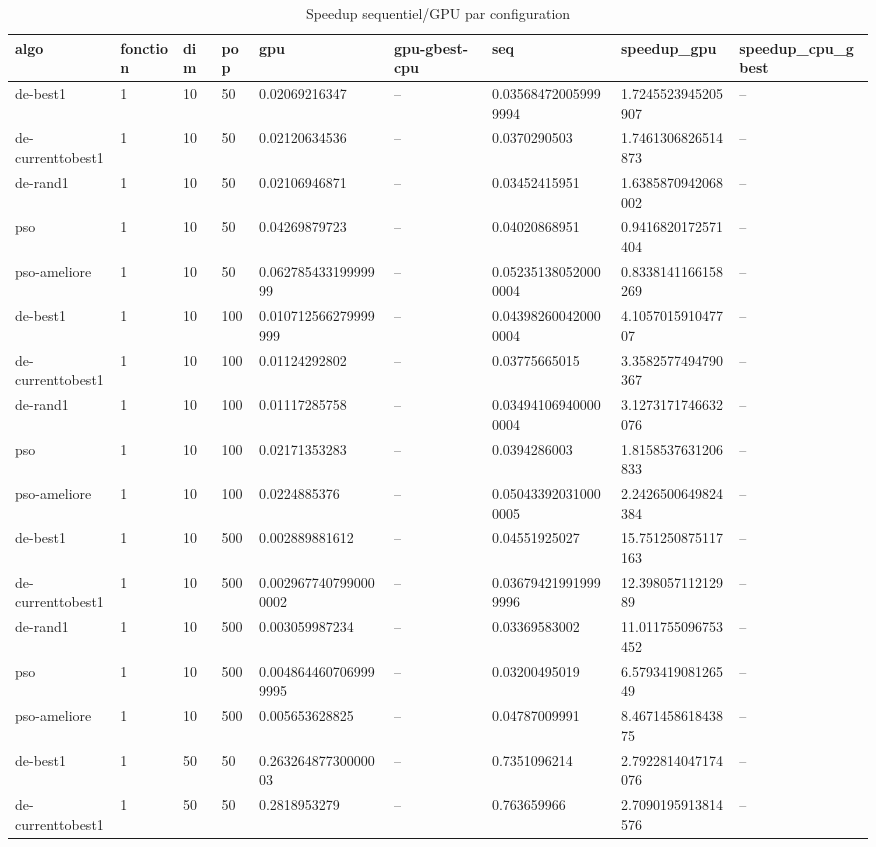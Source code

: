 \begin{table}[t]
\centering
\caption{Speedup sequentiel/GPU par configuration}
\label{tab:generated-speedups}
\scriptsize
\begin{tabular}{lllllllll}
\toprule
algo & fonction & dim & pop & gpu & gpu-gbest-cpu & seq & speedup\_gpu & speedup\_cpu\_gbest \\
\midrule
de-best1 & 1 & 10 & 50 & 0.02069216347 & -- & 0.035684720059999994 & 1.7245523945205907 & -- \\
de-currenttobest1 & 1 & 10 & 50 & 0.02120634536 & -- & 0.0370290503 & 1.7461306826514873 & -- \\
de-rand1 & 1 & 10 & 50 & 0.02106946871 & -- & 0.03452415951 & 1.6385870942068002 & -- \\
pso & 1 & 10 & 50 & 0.04269879723 & -- & 0.04020868951 & 0.9416820172571404 & -- \\
pso-ameliore & 1 & 10 & 50 & 0.06278543319999999 & -- & 0.052351380520000004 & 0.8338141166158269 & -- \\
de-best1 & 1 & 10 & 100 & 0.010712566279999999 & -- & 0.043982600420000004 & 4.105701591047707 & -- \\
de-currenttobest1 & 1 & 10 & 100 & 0.01124292802 & -- & 0.03775665015 & 3.3582577494790367 & -- \\
de-rand1 & 1 & 10 & 100 & 0.01117285758 & -- & 0.034941069400000004 & 3.1273171746632076 & -- \\
pso & 1 & 10 & 100 & 0.02171353283 & -- & 0.0394286003 & 1.8158537631206833 & -- \\
pso-ameliore & 1 & 10 & 100 & 0.0224885376 & -- & 0.050433920310000005 & 2.2426500649824384 & -- \\
de-best1 & 1 & 10 & 500 & 0.002889881612 & -- & 0.04551925027 & 15.751250875117163 & -- \\
de-currenttobest1 & 1 & 10 & 500 & 0.0029677407990000002 & -- & 0.036794219919999996 & 12.39805711212989 & -- \\
de-rand1 & 1 & 10 & 500 & 0.003059987234 & -- & 0.03369583002 & 11.011755096753452 & -- \\
pso & 1 & 10 & 500 & 0.0048644607069999995 & -- & 0.03200495019 & 6.579341908126549 & -- \\
pso-ameliore & 1 & 10 & 500 & 0.005653628825 & -- & 0.04787009991 & 8.467145861843875 & -- \\
de-best1 & 1 & 50 & 50 & 0.26326487730000003 & -- & 0.7351096214 & 2.7922814047174076 & -- \\
de-currenttobest1 & 1 & 50 & 50 & 0.2818953279 & -- & 0.763659966 & 2.7090195913814576 & -- \\

\end{tabular}
\end{table}
